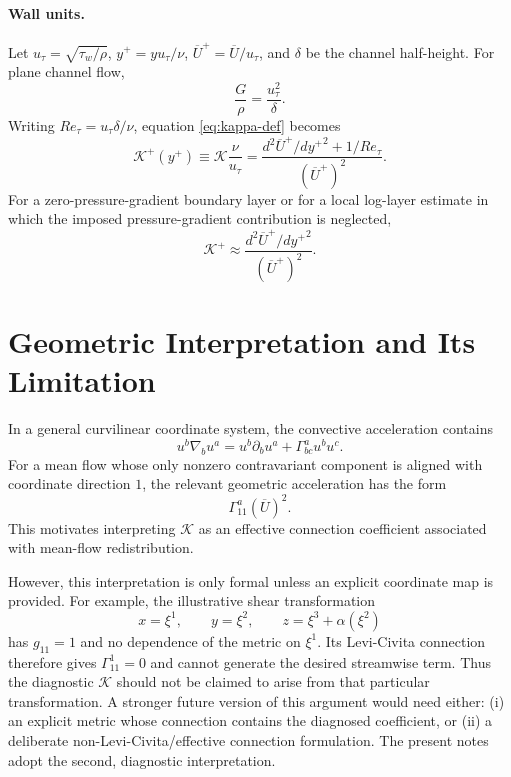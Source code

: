 \documentclass[11pt]{article}
\newcommand{\Ut}{\overline{U}}
\newcommand{\Ret}{Re_\tau}
\newcommand{\kapg}{\mathcal{K}}
\begin{document}
\paragraph{Wall units.} Let $u_\tau=\sqrt{\tau_w/\rho}$, $y^+=yu_\tau/\nu$, $\Ut^+=\Ut/u_\tau$, and $\delta$ be the channel half-height. For plane channel flow,
\begin{equation}
\frac{G}{\rho}=\frac{u_\tau^2}{\delta}.
\end{equation}
Writing $\Ret=u_\tau\delta/\nu$, equation \eqref{eq:kappa-def} becomes
\begin{equation}
\boxed{\;\kapg^+(y^+)\equiv \kapg\frac{\nu}{u_\tau}
=\frac{d^2\Ut^+/d{y^+}^2+1/\Ret}{(\Ut^+)^2}.\;}
\label{eq:kappa-plus-channel}
\end{equation}
For a zero-pressure-gradient boundary layer or for a local log-layer estimate in which the imposed pressure-gradient contribution is neglected,
\begin{equation}
\kapg^+\approx \frac{d^2\Ut^+/d{y^+}^2}{(\Ut^+)^2}.
\label{eq:kappa-plus-zpg}
\end{equation}

\section{Geometric Interpretation and Its Limitation}

In a general curvilinear coordinate system, the convective acceleration contains
\begin{equation}
u^b\nabla_b u^a=u^b\partial_bu^a+\Gamma^a_{bc}u^bu^c.
\end{equation}
For a mean flow whose only nonzero contravariant component is aligned with coordinate direction $1$, the relevant geometric acceleration has the form
\begin{equation}
\Gamma^a_{11}(\Ut)^2.
\end{equation}
This motivates interpreting $\kapg$ as an effective connection coefficient associated with mean-flow redistribution.

However, this interpretation is only formal unless an explicit coordinate map is provided. For example, the illustrative shear transformation
\begin{equation}
x=\xi^1,\qquad y=\xi^2,\qquad z=\xi^3+\alpha(\xi^2)
\end{equation}
has $g_{11}=1$ and no dependence of the metric on $\xi^1$. Its Levi-Civita connection therefore gives $\Gamma^1_{11}=0$ and cannot generate the desired streamwise term. Thus the diagnostic $\kapg$ should not be claimed to arise from that particular transformation. A stronger future version of this argument would need either: (i) an explicit metric whose connection contains the diagnosed coefficient, or (ii) a deliberate non-Levi-Civita/effective connection formulation. The present notes adopt the second, diagnostic interpretation.
\end{document}
